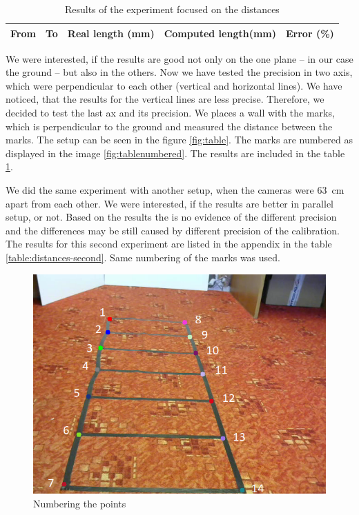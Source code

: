 \begin{table}
\centering
\begin{tabular}{|r|r|r|r|r|}
\hline
From	& To	& Real length (mm) & Computed length(mm) & Error (\%) \\
\hline
\hline

\hline
\end{tabular}
\caption{Results of the experiment focused on the distances}
\label{table:distances}
\end{table}

We were interested, if the results are good not only on the one plane -- in our
case the ground -- but also in the others. Now we have tested the precision in
two axis, which were perpendicular to each other (vertical and horizontal
lines). We have noticed, that the results for the vertical lines are less
precise. Therefore, we decided to test the last ax and its precision. We places
a wall with the marks, which is perpendicular to the ground and measured the
distance between the marks. The setup can be seen in the figure
\ref{fig:table}. The marks are numbered as displayed in the image
\ref{fig:tablenumbered}. The results are included in the table
\ref{table:distances}. 

We did the same experiment with another setup, when the cameras were 63~cm apart
from each other. We were interested, if the results are better in parallel
setup, or not. Based on the results the is no evidence of the different precision
and the differences may be still caused by different precision of the
calibration. The results for this second experiment are listed in the appendix
in the table \ref{table:distances-second}. Same numbering of the marks was used.

\begin{figure}
\centering
\includegraphics[width=0.8\linewidth]{img/experiments/right-ladder-numbered.png}
\caption{Numbering the points}
\label{fig:ladder_numbered}
\end{figure}

